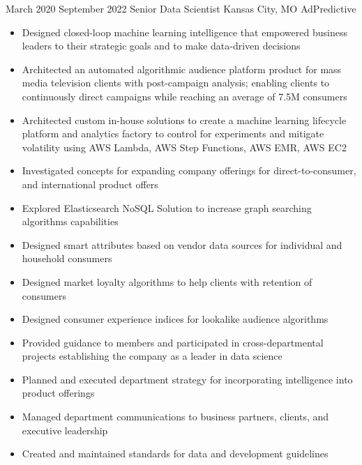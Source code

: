 
\Experience
{March 2020}
{September 2022}
{Senior Data Scientist}
{Kansas City, MO}
{AdPredictive}
{
    \begin{itemize}
        \item Designed closed-loop machine learning intelligence that empowered
        business leaders to their strategic goals and to make data-driven
        decisions
        \item Architected an automated algorithmic audience platform product for
        mass media television clients with post-campaign analysis; enabling
        clients to continuously direct campaigns while reaching an average of
        7.5M consumers
        \item Architected custom in-house solutions to create a machine learning
        lifecycle platform and analytics factory to control for experiments and
        mitigate volatility using AWS Lambda, AWS Step Functions, AWS EMR, AWS
        EC2
        \item Investigated concepts for expanding company offerings for
        direct-to-consumer, and international product offers
        \item Explored Elasticsearch NoSQL Solution to increase graph searching
        algorithms capabilities
        \item Designed smart attributes based on vendor data sources for
        individual and household consumers
        \item Designed market loyalty algorithms to help clients with retention
        of consumers
        \item Designed consumer experience indices for lookalike audience
        algorithms
        \item Provided guidance to members and participated in
        cross-departmental projects establishing the company as a leader in data
        science
        \item Planned and executed department strategy for incorporating
        intelligence into product offerings
        \item Managed department communications to business partners, clients,
        and executive leadership
        \item Created and maintained standards for data and development
        guidelines
    \end{itemize}
}

\vspace*{0.05 in}

